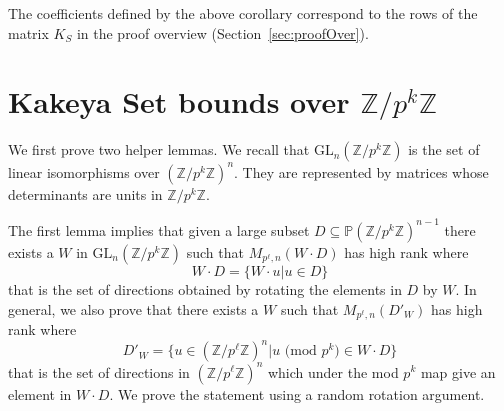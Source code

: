 \documentclass[11pt]{article}
\numberwithin{equation}{section}
\def\GL{\text{GL}}
\def\Z{{\mathbb{Z}}}
\def\P{{\mathbb{P}}}
\begin{document}
The coefficients defined by the above corollary correspond to the rows of the matrix $K_S$ in the proof overview (Section~\ref{sec:proofOver}).


\section{Kakeya Set bounds over $\Z/p^k\Z$}\label{sec:pkBd}

We first prove two helper lemmas. We recall that $\GL_n(\Z/p^k\Z)$ is the set of linear isomorphisms over $(\Z/p^k\Z)^n$. They are represented by matrices whose determinants are units in $\Z/p^k\Z$.

The first lemma implies that given a large subset $D\subseteq \P (\Z/p^k\Z)^{n-1}$ there exists a $W$ in $\GL_n(\Z/p^k\Z)$ such that $M_{p^\ell,n}(W\cdot D)$ has high rank where $$W \cdot D=\{W\cdot u|u\in D\}$$ 
that is the set of directions obtained by rotating the elements in $D$ by $W$. In general, we also prove that there exists a $W$ such that $M_{p^\ell,n}(D'_W)$ has high rank where 
$$D'_W=\{u\in (\Z/p^\ell\Z)^{n}| u\text{ (mod }p^k\text{)}\in W \cdot D\}$$ 
that is the set of directions in  $(\Z/p^\ell\Z)^{n}$ which under the mod $p^k$ map give an element in $W\cdot D$. We prove the statement using a random rotation argument.
\end{document}
